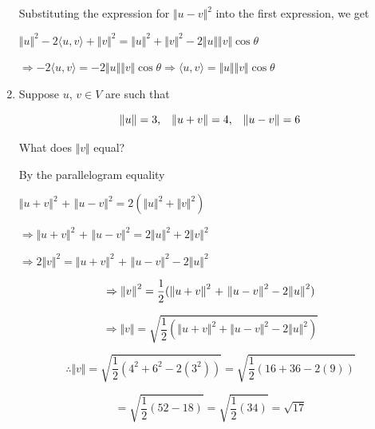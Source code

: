 \documentclass[fleqn]{article}
\makeatletter
\newenvironment{equationCenter}{\@fleqnfalse\begin{equation*}}{\end{equation*}}
\makeatother
\begin{document}
\begin{enumerate}[nolistsep]
			Substituting the expression for ${\Vert u - v \Vert}^2$ into the first expression, we get
			
			${\Vert u \Vert}^2 - 2\langle u, v \rangle + {\Vert v \Vert}^2 = {\Vert u \Vert}^2 + {\Vert v \Vert}^2  - 2{\Vert u \Vert}{\Vert v \Vert}\cos\theta$
			
			$\Rightarrow - 2\langle u, v \rangle = - 2{\Vert u \Vert}{\Vert v \Vert}\cos\theta \Rightarrow \langle u, v \rangle = {\Vert u \Vert}{\Vert v \Vert}\cos\theta$
		
		\pagebreak
		\item Suppose $u$, $v \in V$ are such that
		
			\begin{equationCenter}
				\Vert u \Vert = 3 \text{,\quad} \Vert u + v \Vert = 4 \text{,\quad} \Vert u - v \Vert = 6
			\end{equationCenter}
			
			What does $\Vert v \Vert$ equal?
			
			By the parallelogram equality
			
				${\Vert u + v \Vert}^2$ + ${\Vert u - v \Vert}^2 = 2({\Vert u \Vert}^2 + {\Vert v \Vert}^2)$
				
				$\Rightarrow {\Vert u + v \Vert}^2$ + ${\Vert u - v \Vert}^2 = 2{\Vert u \Vert}^2 + 2{\Vert v \Vert}^2$
				
				$\Rightarrow 2{\Vert v \Vert}^2 = {\Vert u + v \Vert}^2$ + ${\Vert u - v \Vert}^2 - 2{\Vert u \Vert}^2$
				
				\begin{equation*}
					\Rightarrow {\Vert v \Vert}^2 = \frac{1}{2}({\Vert u + v \Vert}^2$ + ${\Vert u - v \Vert}^2 - 2{\Vert u \Vert}^2)
				\end{equation*}
				
				\begin{equation*}
					\Rightarrow {\Vert v \Vert} = \sqrt{\frac{1}{2}({\Vert u + v \Vert}^2 + {\Vert u - v \Vert}^2 - 2{\Vert u \Vert}^2)}
				\end{equation*}
				
				\begin{equation*}
					\therefore {\Vert v \Vert} = \sqrt{\frac{1}{2}(4^2 + 6^2 - 2(3^2))} = \sqrt{\frac{1}{2} (16 + 36 - 2(9))}
				\end{equation*}
				
				\begin{equation*}
					 = \sqrt{\frac{1}{2}(52 - 18)} = \sqrt{\frac{1}{2}(34)} = \sqrt{17}
				\end{equation*}
				

\end{enumerate}
\end{document}
